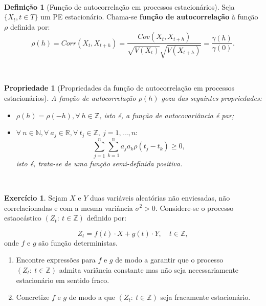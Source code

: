 \documentclass[
  11pt,
  a4paper,
]{book}
\newtheorem{proposition}{Propriedade}[chapter]
\theoremstyle{definition}
\newtheorem{definition}{Definição}[chapter]
\theoremstyle{definition}
\theoremstyle{definition}
\newtheorem{exercise}{Exercício}[chapter]
\theoremstyle{definition}
\theoremstyle{remark}
\begin{document}
\(\,\)

\begin{definition}[Função de autocorrelação em processos estacionários]
Seja \(\{X_t, t \in T\}\) um PE estacionário. Chama-se \textbf{função de autocorrelação} à função
\(\rho\) definida por:
\[\rho(h)=Corr(X_t,X_{t+h})=\dfrac{Cov(X_t,X_{t+h})}{\sqrt{V(X_t)}\sqrt{V(X_{t+h})}}=\dfrac{\gamma(h)}{\gamma(0)}.\]
\end{definition}

\(\,\)

\begin{proposition}[Propriedades da função de autocorrelação em processos estacionários]

A função de autocorrelação \(\rho(h)\) goza das seguintes propriedades:

\begin{itemize}
\item
  \(\rho(h)=\rho(-h), \forall ~h \in \mathbb{Z}\), isto é, a função de autocovariância é
  par;
\item
  \(\forall ~n \in \mathbb{N}, \forall ~a_j \in \mathbb{R}, \forall ~t_j \in \mathbb{Z}, ~j=1, \ldots,n:\)
  \[\sum\limits_{j=1}^{n}\sum\limits_{k=1}^{n} a_ja_k\rho(t_j-t_k) \geq 0,\] isto é,
  trata-se de uma função semi-definida positiva.
\end{itemize}

\end{proposition}

\(\,\)

\begin{exercise}

Sejam \(X\) e \(Y\) duas variáveis aleatórias não enviesadas, não correlacionadas e com a mesma variância \(\sigma^2>0\). Considere-se o processo estaocástico \((Z_t: ~t \in \mathbb{Z})\) definido por:

\[Z_t=f(t) \cdot X + g(t) \cdot Y, \quad t \in \mathbb{Z},\]
onde \(f\) e \(g\) são função deterministas.

\begin{enumerate}
\def\labelenumi{(\alph{enumi})}
\item
  Encontre expressões para \(f\) e \(g\) de modo a garantir que o processo \((Z_t: ~t \in \mathbb{Z})\) admita variância constante mas não seja necessariamente estacionário em sentido fraco.
\item
  Concretize \(f\) e \(g\) de modo a que \((Z_t: ~t \in \mathbb{Z})\) seja fracamente estacionário.
\end{enumerate}

\end{exercise}
\end{document}
